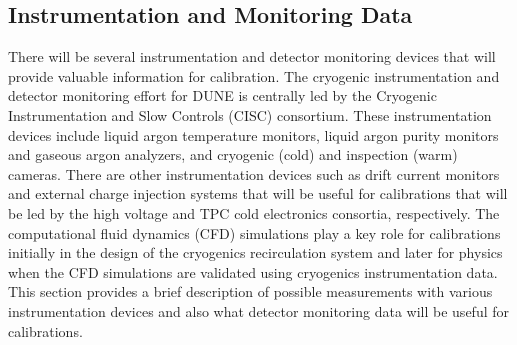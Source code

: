 
\subsection{Instrumentation and Monitoring Data }
\label{sec:inst}
There will be several instrumentation and detector monitoring devices that will provide valuable information for calibration. %
The cryogenic instrumentation and detector monitoring effort for DUNE is centrally led by the Cryogenic Instrumentation and Slow Controls (CISC) consortium. These instrumentation devices include liquid argon temperature monitors, liquid argon purity monitors and gaseous argon analyzers, and cryogenic (cold) and inspection (warm) cameras. There are other instrumentation devices such as drift  current monitors and external charge injection systems that will be useful for calibrations that will be led by the high voltage and TPC cold electronics consortia, respectively. The computational fluid dynamics (CFD) simulations play a key role for calibrations initially in the design of the cryogenics recirculation system and later for physics when the CFD simulations are validated using cryogenics instrumentation data. This section provides a brief description of possible measurements with various instrumentation devices and also what detector monitoring data will be useful for calibrations.

